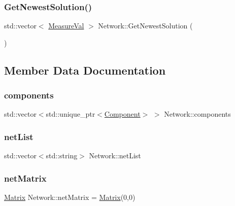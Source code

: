 \mbox{\label{classNetwork_ab22eeab7f44269316967f14c0ad7b063}} 
\subsubsection{\texorpdfstring{Get\+Newest\+Solution()}{GetNewestSolution()}}
{\footnotesize\ttfamily std\+::vector$<$ \hyperlink{structMeasureVal}{Measure\+Val} $>$ Network\+::\+Get\+Newest\+Solution (\begin{DoxyParamCaption}{ }\end{DoxyParamCaption})}



\subsection{Member Data Documentation}
\mbox{\label{classNetwork_a4ee230b842728a61f416cb5a64c5dfb9}} 
\subsubsection{\texorpdfstring{components}{components}}
{\footnotesize\ttfamily std\+::vector$<$std\+::unique\+\_\+ptr$<$\hyperlink{classComponent}{Component}$>$ $>$ Network\+::components\hspace{0.3cm}{\ttfamily [private]}}

\mbox{\label{classNetwork_aa053af925f59bade9a3aff425c232273}} 
\subsubsection{\texorpdfstring{net\+List}{netList}}
{\footnotesize\ttfamily std\+::vector$<$std\+::string$>$ Network\+::net\+List\hspace{0.3cm}{\ttfamily [private]}}

\mbox{\label{classNetwork_ab23ee0b8d12c2002ab3f21fce276ebb6}} 
\subsubsection{\texorpdfstring{net\+Matrix}{netMatrix}}
{\footnotesize\ttfamily \hyperlink{classMatrix}{Matrix} Network\+::net\+Matrix = \hyperlink{classMatrix}{Matrix}(0,0)\hspace{0.3cm}{\ttfamily [private]}}

